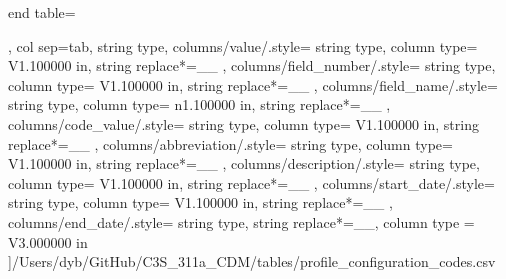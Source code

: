 \begin{landscape}
\begin{longtable}
    end table=\end{longtable},
    col sep=tab,
    string type,
    columns/value/.style={
            string type, 
            column type= V{1.100000 in}, 
            string replace*={_}{\_}
        },
    columns/field_number/.style={
            string type, 
            column type= V{1.100000 in}, 
            string replace*={_}{\_}
        },
    columns/field_name/.style={
            string type, 
            column type= n{1.100000 in}, 
            string replace*={_}{\_}
        },
    columns/code_value/.style={
            string type, 
            column type= V{1.100000 in}, 
            string replace*={_}{\_}
        },
    columns/abbreviation/.style={
            string type, 
            column type= V{1.100000 in}, 
            string replace*={_}{\_}
        },
    columns/description/.style={
            string type, 
            column type= V{1.100000 in}, 
            string replace*={_}{\_}
        },
    columns/start_date/.style={
            string type, 
            column type= V{1.100000 in}, 
            string replace*={_}{\_}
        },
    columns/end_date/.style={
            string type, 
            string replace*={_}{\_},
            column type = V{3.000000 in}
        }
    ]{/Users/dyb/GitHub/C3S_311a_CDM/tables/profile_configuration_codes.csv}
\end{landscape}

